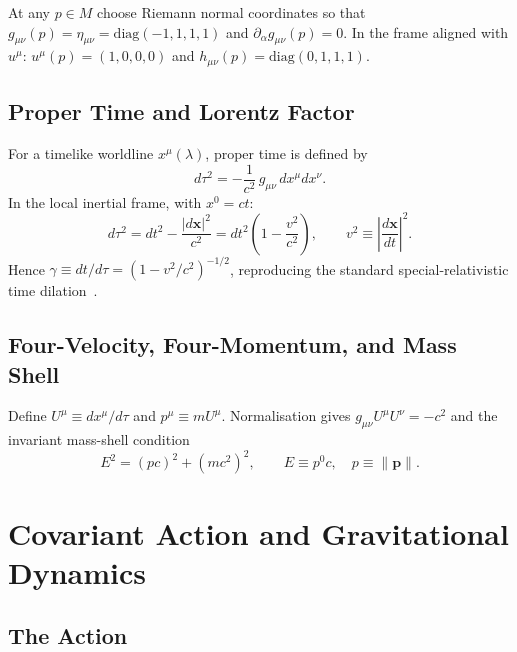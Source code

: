 \documentclass[12pt,a4paper]{article}
\begin{document}
At any $p\in M$ choose Riemann normal coordinates so that
$g_{\mu\nu}(p)=\eta_{\mu\nu}=\mathrm{diag}(-1,1,1,1)$ and
$\partial_{\alpha}g_{\mu\nu}(p)=0$. In the frame aligned with $u^{\mu}$:
$u^{\mu}(p)=(1,0,0,0)$ and $h_{\mu\nu}(p)=\mathrm{diag}(0,1,1,1)$.

\subsection{Proper Time and Lorentz Factor}

For a timelike worldline $x^{\mu}(\lambda)$, proper time is defined by
\begin{equation}
  d\tau^{2}=-\frac{1}{c^{2}}\,g_{\mu\nu}\,dx^{\mu}dx^{\nu}.
\end{equation}
In the local inertial frame, with $x^{0}=ct$:
\begin{equation}
  d\tau^{2}=dt^{2}-\frac{|d\mathbf{x}|^{2}}{c^{2}}
           =dt^{2}\!\left(1-\frac{v^{2}}{c^{2}}\right),
  \qquad v^{2}\equiv\left|\frac{d\mathbf{x}}{dt}\right|^{2}.
\end{equation}
Hence $\gamma\equiv dt/d\tau=(1-v^{2}/c^{2})^{-1/2}$, reproducing the
standard special-relativistic time dilation~\citep{will2014,carroll2004}.

\subsection{Four-Velocity, Four-Momentum, and Mass Shell}

Define $U^{\mu}\equiv dx^{\mu}/d\tau$ and $p^{\mu}\equiv mU^{\mu}$.
Normalisation gives $g_{\mu\nu}U^{\mu}U^{\nu}=-c^{2}$ and the invariant
mass-shell condition
\begin{equation}
  E^{2}=(pc)^{2}+(mc^{2})^{2},\qquad E\equiv p^{0}c,\quad p\equiv\|\mathbf{p}\|.
  \label{eq:massshell}
\end{equation}

\section{Covariant Action and Gravitational Dynamics}
\label{sec:action}

\subsection{The Action}
\end{document}
